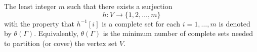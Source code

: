 The least integer $m$ such that there exists a surjection
$$h: V \to \{1, 2, \ldots, m\}$$
with the property that $h^{-1}[i]$ is a complete set for each $i = 1, \ldots, m$ is denoted by $\theta(\Gamma)$. Equivalently, $\theta(\Gamma)$ is the minimum number of complete sets needed to partition (or cover) the vertex set $V$.
